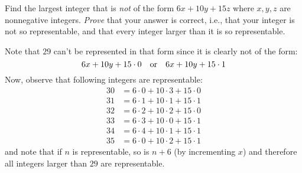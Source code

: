 \begin{exercise}
    Find the largest integer that is \emph{not} of the form $6x+10y+15z$ where $x,y,z$ are nonnegative integers. \emph{Prove} that your answer is correct, i.e., that your integer is not so representable, and that every integer larger than it is so representable.
\end{exercise}
\begin{solution}
    Note that $29$ can't be represented in that form since it is clearly not of the form:
    \[
        6x + 10y + 15\cdot 0 \quad \textnormal{or} \quad 6x+10y+15\cdot 1
    \]
    Now, observe that following integers are representable:
    \begin{align*}
        30 &= 6\cdot 0 + 10\cdot 3 + 15\cdot 0 \\
        31 &= 6\cdot 1 + 10\cdot 1 + 15\cdot 1 \\
        32 &= 6 \cdot 2 + 10\cdot 2 + 15\cdot 0 \\
        33 &= 6\cdot 3 + 10\cdot 0 + 15\cdot 1 \\
        34 &= 6\cdot 4 + 10 \cdot 1 + 15\cdot 1 \\
        35 &= 6\cdot 0 + 10\cdot 2 + 15 \cdot 1
    \end{align*}
    and note that if $n$ is representable, so is $n+6$ (by incrementing $x$) and therefore all integers larger than $29$ are representable.
\end{solution}


